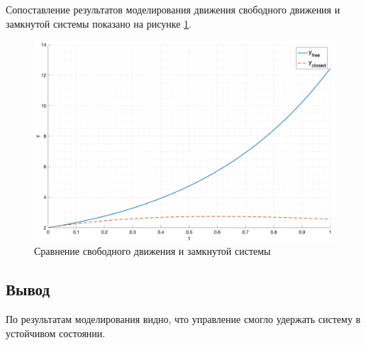 Сопоставление результатов моделирования движения свободного движения и замкнутой системы показано на рисунке \ref{fig:task1_compare}.
\begin{figure}[ht!]
    \centering
    \includegraphics[width=\textwidth]{"media/plots/task1_comp.png"}
    \caption{Сравнение свободного движения и замкнутой системы}
    \label{fig:task1_compare}
\end{figure}


\subsection{Вывод}
По результатам моделирования видно, что управление смогло удержать систему в устойчивом состоянии.

